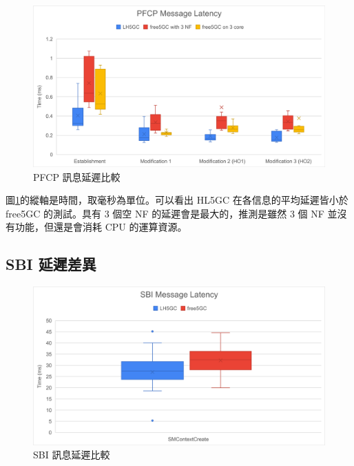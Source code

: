 \begin{figure}[htb]
    \centering
    \includegraphics[height=!,width=1\linewidth,keepaspectratio=true]{figures/cp_pfcp_comp}
    \caption[PFCP 訊息延遲比較]{{\footnotesize PFCP 訊息延遲比較}}
    \label{fig:cp_pfcp_comp}
\end{figure}

圖\ref{fig:cp_pfcp_comp}的縱軸是時間，取毫秒為單位。可以看出 HL5GC 在各信息的平均延遲皆小於 free5GC 的測試。具有 3 個空 NF 的延遲會是最大的，推測是雖然 3 個 NF 並沒有功能，但還是會消耗 CPU 的運算資源。

\subsection{SBI 延遲差異}
\label{subsec:sbi_comp}

\begin{figure}[htb]
    \centering
    \includegraphics[height=!,width=1\linewidth,keepaspectratio=true]{figures/cp_sbi_comp}
    \caption[SBI 訊息延遲比較]{{\footnotesize SBI 訊息延遲比較}}
    \label{fig:cp_sbi_comp}
\end{figure}

